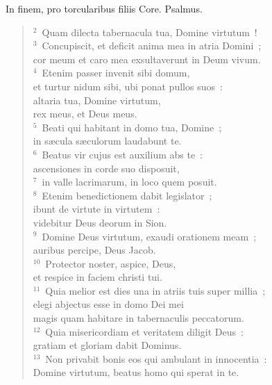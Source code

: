 \bchapter
\lettrine[lines=3,image=true,loversize=0.05,lraise=-0.03]{I}{}n finem, pro torcularibus filiis Core. Psalmus.
\begin{flushleft}\begin{verse}\vspace{6pt}${}^{2}$~Quam dilecta tabernacula tua, Domine virtutum~!\\
${}^{3}$~Concupiscit, et deficit anima mea in atria Domini~;\\ cor meum et caro mea exsultaverunt in Deum vivum.\\
${}^{4}$~Etenim passer invenit sibi domum,\\ et turtur nidum sibi, ubi ponat pullos suos~:\\ altaria tua, Domine virtutum,\\ rex meus, et Deus meus.\\
${}^{5}$~Beati qui habitant in domo tua, Domine~;\\ in s\ae cula s\ae culorum laudabunt te.\\
${}^{6}$~Beatus vir cujus est auxilium abs te~:\\ ascensiones in corde suo disposuit,\\
${}^{7}$~in valle lacrimarum, in loco quem posuit.\\
${}^{8}$~Etenim benedictionem dabit legislator~;\\ ibunt de virtute in virtutem~:\\ videbitur Deus deorum in Sion.\\
${}^{9}$~Domine Deus virtutum, exaudi orationem meam~;\\ auribus percipe, Deus Jacob.\\
${}^{10}$~Protector noster, aspice, Deus,\\ et respice in faciem christi tui.\\
${}^{11}$~Quia melior est dies una in atriis tuis super millia~;\\ elegi abjectus esse in domo Dei mei\\ magis quam habitare in tabernaculis peccatorum.\\
${}^{12}$~Quia misericordiam et veritatem diligit Deus~:\\ gratiam et gloriam dabit Dominus.\\
${}^{13}$~Non privabit bonis eos qui ambulant in innocentia~:\\ Domine virtutum, beatus homo qui sperat in te.\end{verse}\end{flushleft}



